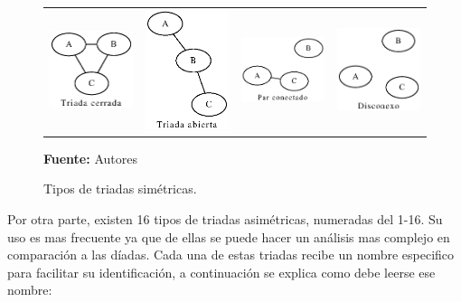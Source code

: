\begin{figure}[!htb]
  \begin{center}
      \begin{tabular}{m{3cm}|m{3cm}|m{3cm}|m{3cm}}
        \includegraphics[width=3cm]{./imagenes/triada_simetrica_1.eps} & 
        \includegraphics[width=3cm]{./imagenes/triada_simetrica_2.eps} & 
        \includegraphics[width=3cm]{./imagenes/triada_simetrica_3.eps} & 
        \includegraphics[width=3cm]{./imagenes/triada_simetrica_4.eps}\\
      \end{tabular}
    \caption{Tipos de triadas simétricas.}
    \label{fig:tipos_triadas_simetricas}
    \textbf{Fuente:}  Autores
  \end{center}
\end{figure}


Por otra parte, existen 16 tipos de triadas asimétricas, numeradas del 1-16. Su uso es mas frecuente ya que de ellas se puede hacer un análisis mas complejo en comparación a las díadas. Cada una de estas triadas recibe un nombre especifico para facilitar su identificación, a continuación se explica como debe leerse ese nombre:

